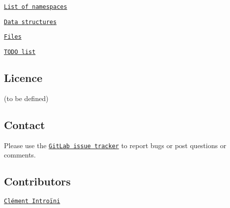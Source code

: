 \begin{DoxyEnumerate}
\item \href{namespaces.html}{\tt List of namespaces}
\item \href{classes.html}{\tt Data structures}
\item \href{files.html}{\tt Files}
\item \href{__todo.html}{\tt T\+O\+DO list}
\end{DoxyEnumerate}\hypertarget{index__licence}{}\subsection{Licence}\label{index__licence}
(to be defined)\hypertarget{index__contact}{}\subsection{Contact}\label{index__contact}
Please use the \href{https://www-git-cad.intra.cea.fr/DEC/collaboratif/ci230846/diffusion/pf-mfem}{\tt Git\+Lab issue tracker} to report bugs or post questions or comments.\hypertarget{index__contributors}{}\subsection{Contributors}\label{index__contributors}

\begin{DoxyItemize}
\item \href{https://www.researchgate.net/profile/Clement-Introini}{\tt Clément Introïni} 
\end{DoxyItemize}